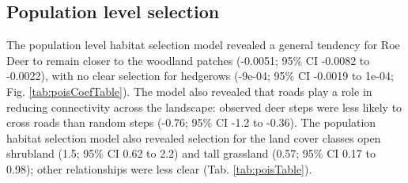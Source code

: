 \documentclass[10pt,a4paper]{article}
\begin{document}
\subsection{Population level selection}\label{population-level-selection}

The population level habitat selection model revealed a general tendency for Roe Deer to remain closer to the woodland patches (-0.0051; 95\% CI -0.0082 to -0.0022), with no clear selection for hedgerows (-9e-04; 95\% CI -0.0019 to 1e-04; Fig. \ref{tab:poisCoefTable}).
The model also revealed that roads play a role in reducing connectivity across the landscape: observed deer steps were less likely to cross roads than random steps (-0.76; 95\% CI -1.2 to -0.36).
The population habitat selection model also revealed selection for the land cover classes open shrubland (1.5; 95\% CI 0.62 to 2.2) and tall grassland (0.57; 95\% CI 0.17 to 0.98); other relationships were less clear (Tab. \ref{tab:poisTable}).

\begingroup\fontsize{9}{11}\selectfont
\end{document}
